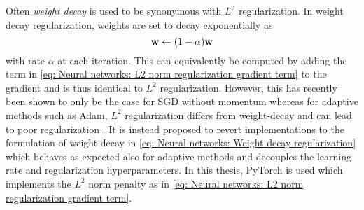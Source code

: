 Often \textit{weight decay} is used to be synonymous with $L^2$ regularization. In weight decay regularization, weights are set to decay exponentially as
\begin{equation}\label{eq: Neural networks: Weight decay regularization}
    \w \leftarrow (1-\alpha)\w %
\end{equation}
with rate $\alpha$ at each iteration. This can equivalently be computed by adding the term in \eqref{eq: Neural networks: L2 norm regularization gradient term} to the gradient \cite{Hanson1989} and is thus identical to $L^2$ regularization. However, this has recently been shown to only be the case for \gls{SGD} without momentum whereas for adaptive methods such as Adam, $L^2$ regularization differs from weight-decay and can lead to poor regularization \cite{Loshchilov2017}. It is instead proposed to revert implementations to the formulation of weight-decay in \eqref{eq: Neural networks: Weight decay regularization} which behaves as expected also for adaptive methods \cite{Loshchilov2017} and decouples the learning rate and regularization hyperparameters. In this thesis, PyTorch is used which implements the $L^2$ norm penalty as in \eqref{eq: Neural networks: L2 norm regularization gradient term}.


